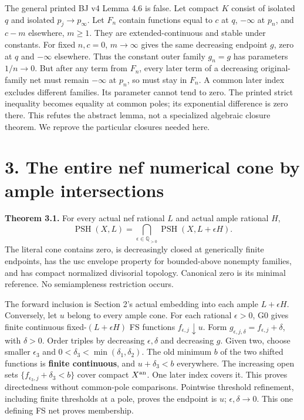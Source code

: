\documentclass[
  10pt,
]{article}
\begin{document}
The general printed BJ v4 Lemma 4.6 is false. Let compact \(K\) consist
of isolated \(q\) and isolated \(p_j\to p_\infty\). Let \(F_n\) contain
functions equal to \(c\) at \(q\), \(-\infty\) at \(p_n\), and \(c-m\)
elsewhere, \(m\ge1\). They are extended-continuous and stable under
constants. For fixed \(n,c=0\), \(m\to\infty\) gives the same decreasing
endpoint \(g\), zero at \(q\) and \(-\infty\) elsewhere. Thus the
constant outer family \(g_n=g\) has parameters \(1/n\to0\). But after
any term from \(F_n\), every later term of a decreasing original-family
net must remain \(-\infty\) at \(p_n\), so must stay in \(F_n\). A
common later index excludes different families. Its parameter cannot
tend to zero. The printed strict inequality becomes equality at common
poles; its exponential difference is zero there. This refutes the
abstract lemma, not a specialized algebraic closure theorem. We reprove
the particular closures needed here.

\section{3. The entire nef numerical cone by ample
intersections}\label{the-entire-nef-numerical-cone-by-ample-intersections}

\textbf{Theorem 3.1.} For every actual nef rational \(L\) and actual
ample rational \(H\), \[\operatorname{PSH}(X,L)=
\bigcap_{\epsilon\in\mathbb Q_{>0}}\operatorname{PSH}(X,L+\epsilon H). \tag{3.1}\]
The literal cone contains zero, is decreasingly closed at generically
finite endpoints, has the usc envelope property for bounded-above
nonempty families, and has compact normalized divisorial topology.
Canonical zero is its minimal reference. No semiampleness restriction
occurs.

The forward inclusion is Section 2's actual embedding into each ample
\(L+\epsilon H\). Conversely, let \(u\) belong to every ample cone. For
each rational \(\epsilon>0\), G0 gives finite continuous
fixed-\((L+\epsilon H)\) FS functions \(f_{\epsilon,j}\downarrow u\).
Form \(g_{\epsilon,j,\delta}=f_{\epsilon,j}+\delta\), with \(\delta>0\).
Order triples by decreasing \(\epsilon,\delta\) and decreasing \(g\).
Given two, choose smaller \(\epsilon_3\) and
\(0<\delta_3<\min(\delta_1,\delta_2)\). The old minimum \(b\) of the two
shifted functions is \textbf{finite continuous}, and \(u+\delta_3<b\)
everywhere. The increasing open sets \(\{f_{\epsilon_3,j}+\delta_3<b\}\)
cover compact \(X^{\rm an}\). One later index covers it. This proves
directedness without common-pole comparisons. Pointwise threshold
refinement, including finite thresholds at a pole, proves the endpoint
is \(u\); \(\epsilon,\delta\to0\). This one defining FS net proves
membership.
\end{document}
